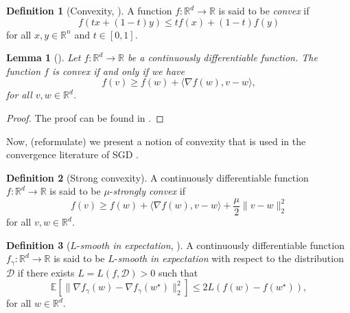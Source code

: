 \documentclass[12pt]{article}
\newtheorem{lemma}[lemma]{Lemma}
\theoremstyle{definition}
\newtheorem{definition}[definition]{Definition}
\numberwithin{equation}{section}
\newcommand{\R}{\mathbb{R}}
\newcommand{\norm}[1]{\lVert{#1}\rVert_2}
\begin{document}
\begin{definition}[Convexity, ]
  A function $f : \mathbb{R}^d \rightarrow \mathbb{R}$ is said to be \emph{convex} if 
  \begin{equation}
    f(tx+(1-t)y) \leq tf(x)+(1-t)f(y)
  \end{equation}
  for all $x,y \in \mathbb{R}^n$ and $t \in [0,1]$.
\end{definition}
\begin{lemma}[]
  \label{lemma:convexity}
  Let $f : \mathbb{R}^d \rightarrow \mathbb{R}$ be a continuously differentiable function. The function $f$ is convex if and only if we have
  \begin{equation*}
    f(v) \geq f(w) + \langle \nabla f(w), v-w \rangle,
  \end{equation*}
  for all $v,w \in \R^d$.
\end{lemma}
\begin{proof}
  The proof can be found in \autocite{boydConvexOptimization2004}.
\end{proof}

Now, (reformulate) we present a notion of convexity that is used in the convergence literature of SGD \autocite{sebbouhAlmostSureConvergence2021}. 
\begin{definition}[Strong convexity]
  A continuously differentiable function $f : \mathbb{R}^d \rightarrow \mathbb{R}$ is said to be $\mu$-\emph{strongly convex} if
  \begin{equation}
    f(v) \geq f(w) + \langle \nabla f(w), v - w \rangle + \frac{\mu}{2} \norm{v - w}^2
  \end{equation}
  for all $v, w \in \mathbb{R}^d$.
\end{definition}

\begin{definition}[$L$-\emph{smooth in expectation}, ]
  A continuously differentiable  function $f_{\gamma}:\mathbb{R}^d \rightarrow \mathbb{R}$ is said to be $L$-\emph{smooth in expectation} with respect to the distribution $\mathcal{D}$ if there exists $L = L(f, \mathcal{D}) > 0$ such that 
  \begin{equation}
    \mathbb{E}[\norm{\nabla f_{\gamma}(w) - \nabla f_{\gamma}(w^\star)}^2] \leq 2 L(f(w) - f(w^\star)),
  \end{equation}
  for all $w \in \mathbb{R}^d$. 
\end{definition}
\end{document}
